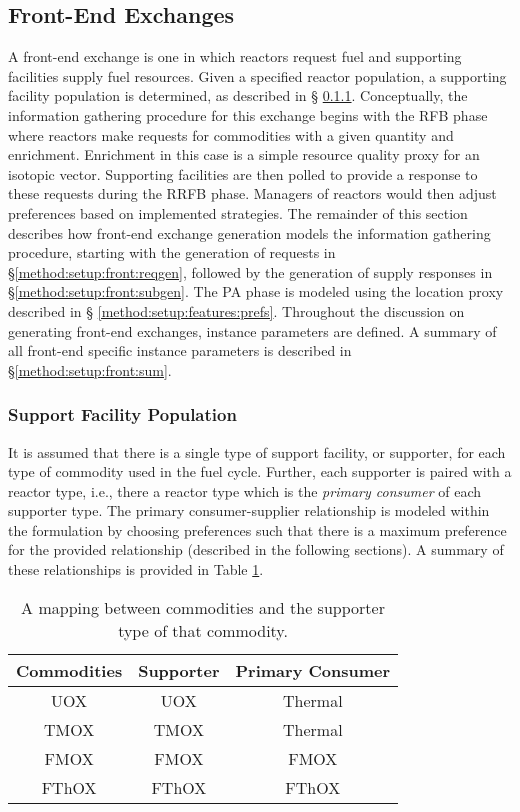 \subsection{Front-End Exchanges}\label{method:setup:front}

A front-end exchange is one in which reactors request fuel and supporting
facilities supply fuel resources. Given a specified reactor population, a
supporting facility population is determined, as described in \S
\ref{method:setup:front:sup}. Conceptually, the information gathering procedure
for this exchange begins with the RFB phase where reactors make requests for
commodities with a given quantity and enrichment. Enrichment in this case is a
simple resource quality proxy for an isotopic vector. Supporting facilities are
then polled to provide a response to these requests during the RRFB
phase. Managers of reactors would then adjust preferences based on implemented
strategies. The remainder of this section describes how front-end exchange
generation models the information gathering procedure, starting with the
generation of requests in \S \ref{method:setup:front:reqgen}, followed by the
generation of supply responses in \S \ref{method:setup:front:subgen}. The PA
phase is modeled using the location proxy described in \S
\ref{method:setup:features:prefs}. Throughout the discussion on generating
front-end exchanges, instance parameters are defined. A summary of all front-end
specific instance parameters is described in \S \ref{method:setup:front:sum}.

\subsubsection{Support Facility Population} \label{method:setup:front:sup}

It is assumed that there is a single type of support facility, or supporter, for
each type of commodity used in the fuel cycle. Further, each supporter is paired
with a reactor type, i.e., there a reactor type which is the \textit{primary
  consumer} of each supporter type. The primary consumer-supplier relationship
is modeled within the formulation by choosing preferences such that there is a
maximum preference for the provided relationship (described in the following
sections). A summary of these relationships is provided in Table
\ref{tbl:commod_to_sup}.

\begin{table}[h!]
\centering
\caption{A mapping between commodities and the supporter type of that commodity.}
\label{tbl:commod_to_sup}
\begin{tabular}{|c|c|c|}
\hline
\textbf{Commodities}            & \textbf{Supporter} & \textbf{Primary Consumer} \\ \hline
UOX                    & UOX  & Thermal       \\ \hline
TMOX                    & TMOX & Thermal        \\ \hline
FMOX                    & FMOX & FMOX        \\ \hline
FThOX                    & FThOX & FThOX        \\ \hline
\end{tabular}
\end{table}

